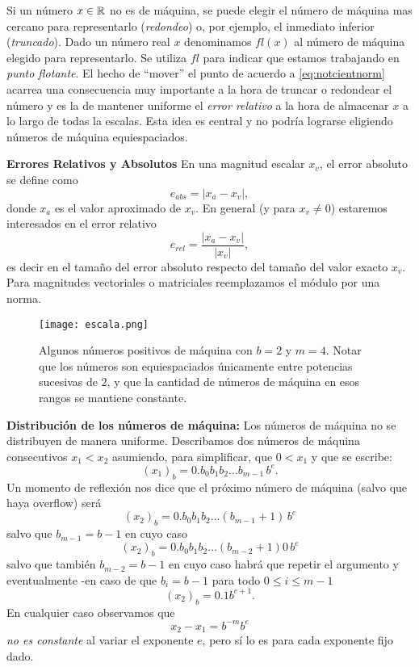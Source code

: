 Si un número $x\in \mathbb R$ no es de máquina, se puede elegir el número de máquina mas cercano para representarlo (\emph{redondeo}) o, por ejemplo, el inmediato inferior (\emph{truncado}). Dado un número real $x$ denominamos $fl(x)$ al número de máquina elegido para representarlo. Se utiliza $fl$ para indicar que estamos trabajando en \emph{punto flotante}. El hecho de ``mover'' el punto de acuerdo a \eqref{eq:notcientnorm} acarrea una consecuencia muy importante a la hora de truncar o redondear el número y es la de mantener uniforme el \emph{error relativo}  a la hora de almacenar $x$ a lo largo de todas la escalas. Esta idea es central y no podría lograrse eligiendo números de máquina equiespaciados.
\begin{tcolorbox}{\bf Errores Relativos y Absolutos}
 En una magnitud escalar $x_v$, el error absoluto se define como
$$
e_{abs}=|x_a-x_v|,
$$
donde $x_a$ es el valor aproximado de $x_v$. En general (y para $x_v\neq 0$) estaremos interesados en el error relativo
$$
e_{rel}=\frac{|x_a-x_v|}{|x_v|},
$$
es decir en el tamaño del error absoluto respecto del tamaño del valor exacto $x_v$. Para magnitudes vectoriales o matriciales reemplazamos el módulo por una norma.
\end{tcolorbox}
\begin{figure}
 \texttt{[image: escala.png]}
\caption{Algunos números positivos de máquina con $b=2$ y $m=4$. Notar que los números son equiespaciados únicamente entre potencias sucesivas de $2$, y que la cantidad de números de máquina en esos rangos se mantiene constante.}
\end{figure}
\begin{tcolorbox}{\bf Distribución de los números de máquina:}
Los números de máquina no se distribuyen de manera uniforme. Describamos dos números de máquina consecutivos  $x_1<x_2$ asumiendo, para simplificar,  que $0<x_1$ y que se escribe:
$$(x_1)_b= 0.b_0b_1b_2...b_{m-1}\, b^{e}.$$
Un momento de reflexión nos dice que el próximo número de máquina (salvo que haya overflow) será
$$(x_2)_b=0.b_0b_1b_2...(b_{m-1}+1)\, b^{e}$$
salvo que $b_{m-1}=b-1$ en cuyo caso
$$(x_2)_b=0.b_0b_1b_2...(b_{m-2}+1)0\, b^{e}$$
salvo que también $b_{m-2}=b-1$ en cuyo caso habrá que repetir el argumento y eventualmente -en caso de que $b_i=b-1$ para todo $0\le i\le m-1$
$$(x_2)_b=0.1b^{e+1}.$$
En cualquier caso observamos que
$$
x_2-x_1=b^{-m}b^e
$$
\emph{no es constante} al variar el exponente $e$, pero sí lo es para cada exponente fijo dado.

\end{tcolorbox}

